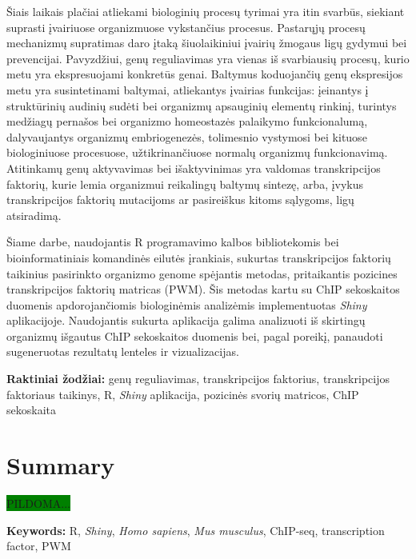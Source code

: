\documentclass[12pt]{article}
\begin{document}
Šiais laikais plačiai atliekami biologinių procesų tyrimai yra itin svarbūs,
siekiant suprasti įvairiuose organizmuose vykstančius procesus. Pastarųjų
procesų mechanizmų supratimas daro įtaką šiuolaikiniui įvairių žmogaus ligų
gydymui bei prevencijai. Pavyzdžiui, genų reguliavimas yra vienas iš svarbiausių procesų,
kurio metu yra ekspresuojami konkretūs genai. Baltymus koduojančių genų
ekspresijos metu yra susintetinami baltymai, atliekantys įvairias funkcijas:
įeinantys į struktūrinių audinių sudėti bei organizmų apsauginių elementų
rinkinį, turintys medžiagų pernašos bei organizmo homeostazės palaikymo
funkcionalumą, dalyvaujantys organizmų embriogenezės, tolimesnio vystymosi
bei kituose biologiniuose procesuose, užtikrinančiuose normalų organizmų
funkcionavimą. Atitinkamų genų aktyvavimas bei išaktyvinimas yra valdomas
transkripcijos faktorių, kurie lemia organizmui reikalingų baltymų sintezę,
arba, įvykus transkripcijos faktorių mutacijoms ar pasireiškus kitoms sąlygoms,
ligų atsiradimą.

Šiame darbe, naudojantis R programavimo kalbos bibliotekomis bei
bioinformatiniais komandinės eilutės įrankiais, sukurtas transkripcijos faktorių
taikinius pasirinkto organizmo genome spėjantis metodas, pritaikantis pozicines
transkripcijos faktorių matricas (PWM). Šis metodas kartu su ChIP sekoskaitos
duomenis apdorojančiomis biologinėmis analizėmis implementuotas \emph{Shiny}
aplikacijoje. Naudojantis sukurta aplikacija galima analizuoti iš skirtingų
organizmų išgautus ChIP sekoskaitos duomenis bei, pagal poreikį, panaudoti
sugeneruotas rezultatų lenteles ir vizualizacijas.



\hfill \break
\textbf{Raktiniai žodžiai:} genų reguliavimas, transkripcijos faktorius, 
transkripcijos faktoriaus taikinys, R, \emph{Shiny} aplikacija, pozicinės svorių
matricos, ChIP sekoskaita

\newpage


\section*{Summary}
\colorbox{green}{PILDOMA...}

\hfill \break
\textbf{Keywords:} R, \emph{Shiny}, \emph{Homo sapiens},
\emph{Mus musculus}, ChIP-seq, transcription factor, PWM

\newpage
\end{document}
